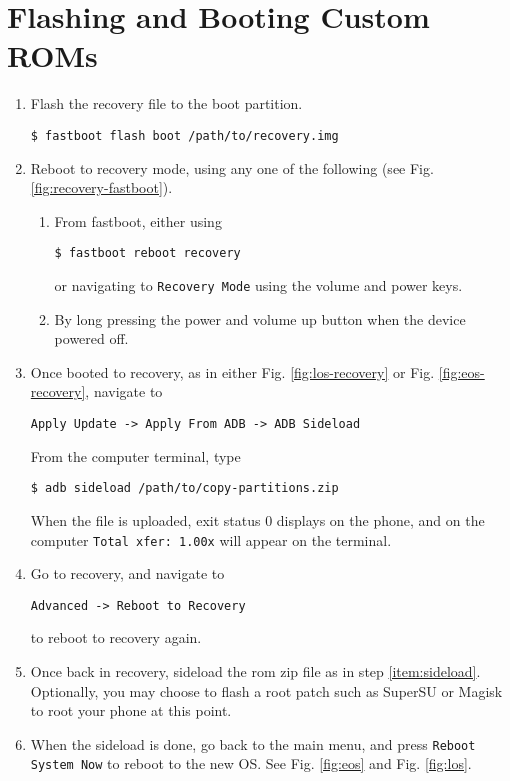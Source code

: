 \documentclass[journal,12pt,twocolumn]{IEEEtran}
\renewcommand\thesection{\arabic{section}}
\begin{document}
\section{Flashing and Booting Custom ROMs}

\begin{enumerate}[label=\thesection.\arabic*
,ref=\thesection.\theenumi]
\item Flash the recovery file to the boot partition.
\begin{lstlisting}
$ fastboot flash boot /path/to/recovery.img
\end{lstlisting}
\item Reboot to recovery mode, using any one of the following (see Fig. 
\ref{fig:recovery-fastboot}).
\begin{enumerate}
\item From fastboot, either using
\begin{lstlisting}
$ fastboot reboot recovery
\end{lstlisting}
or navigating to \texttt{Recovery Mode} using the volume and power keys.
\item By long pressing the power and volume up button when the device
powered off.
\end{enumerate}
\item \label{item:sideload}
Once booted to recovery, as in either Fig. \ref{fig:los-recovery} or Fig. 
\ref{fig:eos-recovery}, navigate to 
\begin{lstlisting}
Apply Update -> Apply From ADB -> ADB Sideload
\end{lstlisting}
From the computer terminal, type
\begin{lstlisting}
$ adb sideload /path/to/copy-partitions.zip
\end{lstlisting}
When the file is uploaded, exit status 0 displays on the phone, and on the
computer \texttt{Total xfer: 1.00x} will appear on the terminal.
\item Go to recovery, and navigate to
\begin{lstlisting}
Advanced -> Reboot to Recovery
\end{lstlisting}
to reboot to recovery again.
\item Once back in recovery, sideload the rom zip file as in step 
\ref{item:sideload}. Optionally, you may choose to flash a root patch such
as SuperSU or Magisk to root your phone at this point.
\item When the sideload is done, go back to the main menu, and press
\texttt{Reboot System Now} to reboot to the new OS. See Fig. \ref{fig:eos} and
Fig. \ref{fig:los}.
\end{enumerate}
\end{document}
